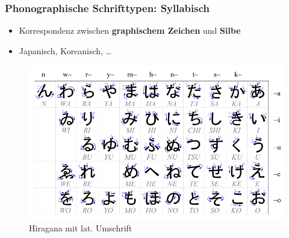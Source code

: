 \begin{frame}
\frametitle{Phonographische Schrifttypen: Syllabisch}

\begin{itemize}
	\item Korrespondenz zwischen \textbf{graphischem Zeichen} und \textbf{Silbe}
	\item Japanisch, Koreanisch, \dots
	

\end{itemize}
	\begin{figure}
		\centering
		
		\includegraphics[scale=.25]{material/05Table_hiragana}
		\caption{Hiragana mit lat. Umschrift}
	\end{figure}

\end{frame}


